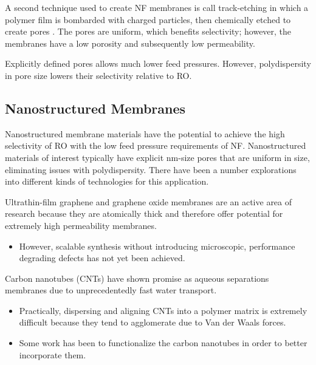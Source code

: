   A second technique used to create NF membranes is call track-etching in which a polymer
  film is bombarded with charged particles, then chemically etched to create pores
  \cite{apel_track_2001}. The pores are uniform, which benefits selectivity;
  however, the membranes have a low porosity and subsequently low permeability. 
  
  Explicitly defined pores allows much lower feed pressures. However, polydispersity in
  pore size lowers their selectivity relative to RO.
  
  \subsection{Nanostructured Membranes}
  
  Nanostructured membrane materials have the potential to achieve the high selectivity
  of RO with the low feed pressure requirements of NF. Nanostructured materials of 
  interest typically have explicit nm-size pores that are uniform in size, eliminating
  issues with polydispersity. There have been a number explorations into different
  kinds of technologies for this application.
  
  Ultrathin-film
  graphene and graphene oxide membranes are an active area of research because
  they are atomically thick and therefore offer potential for extremely high
  permeability membranes.~\cite{humplik_nanostructured_2011} 
  \begin{itemize}  
    \item However, scalable synthesis without introducing microscopic, performance
    degrading defects has not yet been achieved.~\cite{cohen-tanugi_multilayer_2016,wei_multilayered_2018}
  \end{itemize}    
  
  Carbon nanotubes (CNTs) have shown promise as aqueous separations membranes
  due to unprecedentedly fast water transport.\cite{humplik_nanostructured_2011,hummer_water_2001}
  \begin{itemize}
	\item Practically, dispersing and aligning CNTs into a polymer matrix is extremely
    difficult because they tend to agglomerate due to Van der Waals forces.~\cite{sahoo_polymer_2010}
    \item Some work has been to functionalize the carbon nanotubes in order to better incorporate them. %
  \end{itemize}
  
